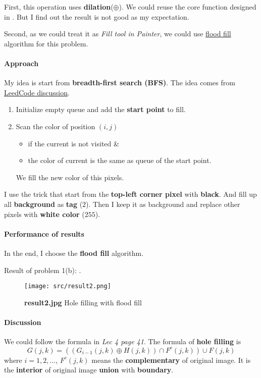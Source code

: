 First, this operation uses \textbf{dilation}(\(\oplus \)). We could reuse the core function designed in . But I find out the result is not good as my expectation.

Second, as we could treat it as \textit{Fill tool in Painter}, we could use \href{https://leetcode.com/problems/flood-fill}{flood fill} algorithm for this problem.

\paragraph{Approach}
My idea is start from \textbf{breadth-first search (BFS)}. The idea comes from \href{https://leetcode.com/problems/flood-fill/discuss/1086688/Python-BFS-easiest-Soln}{LeedCode discussion}.
\begin{enumerate}
    \item Initialize empty queue and add the \textbf{start point} to fill.
    \item Scan the color of position \((i, j)\)
	\begin{itemize}
	    \item if the current is not visited \&
	    \item the color of current is the same as queue of the start point.
	\end{itemize}
	We fill the new color of this pixels.
\end{enumerate}
I use the trick that start from the \textbf{top-left corner pixel} with \textbf{black}. And fill up all \textbf{background} as \textbf{tag} (\(2\)). Then I keep it as background and replace other pixels with \textbf{white color} (\(255\)).

\paragraph{Performance of results}
In the end, I choose the \textbf{flood fill} algorithm.

Result of problem 1(b): .
\begin{figure}
    \centering
    \texttt{[image: src/result2.png]}
    \caption{\textbf{result2.jpg} Hole filling with flood fill}
    \label{result2}
\end{figure}

\paragraph{Discussion}
We could follow the formula in \textit{Lec 4 page 41}. The formula of \textbf{hole filling} is 
\[
    G(j, k) = ( (G_{i-1}(j, k) \oplus H(j, k) ) \cap F^{c}(j, k) ) \cup F(j, k)
\]
where \(i=1, 2, \dots \), \(F^{c}(j, k)\) means the \textbf{complementary} of original image.
It is the \textbf{interior} of original image \textbf{union} with \textbf{boundary}.

